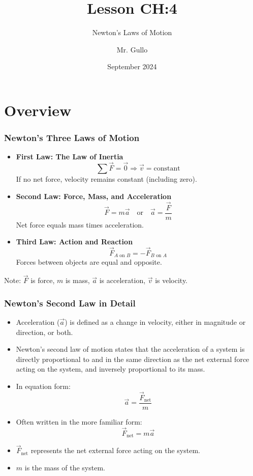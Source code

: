 \documentclass{beamer}
\title{Lesson CH:4}
\subtitle{Newton's Laws of Motion}
\author{Mr. Gullo}
\date{September 2024}
\begin{document}
\frame{\titlepage}

\section{Overview}

\begin{frame}
\frametitle{Newton's Three Laws of Motion}

\begin{itemize}
    \item \textbf{First Law: The Law of Inertia}
    \begin{equation*}
    \sum \vec{F} = \vec{0} \Rightarrow \vec{v} = \text{constant}
    \end{equation*}
    If no net force, velocity remains constant (including zero).

    \item \textbf{Second Law: Force, Mass, and Acceleration}
    \begin{equation*}
    \vec{F} = m\vec{a} \quad \text{or} \quad \vec{a} = \frac{\vec{F}}{m}
    \end{equation*}
    Net force equals mass times acceleration.

    \item \textbf{Third Law: Action and Reaction}
    \begin{equation*}
    \vec{F}_{A \text{ on } B} = -\vec{F}_{B \text{ on } A}
    \end{equation*}
    Forces between objects are equal and opposite.
\end{itemize}

\vspace{0.5cm}
\small{Note: $\vec{F}$ is force, $m$ is mass, $\vec{a}$ is acceleration, $\vec{v}$ is velocity.}
\end{frame}

\begin{frame}
\frametitle{Newton's Second Law in Detail}
\begin{itemize}
    \item Acceleration ($\vec{a}$) is defined as a change in velocity, either in magnitude or direction, or both.
    \item Newton's second law of motion states that the acceleration of a system is directly proportional to and in the same direction as the net external force acting on the system, and inversely proportional to its mass.
    \item In equation form:
    \[\vec{a}=\frac{\vec{F}_{\text{net}}}{m}\]
    \item Often written in the more familiar form:
    \[\vec{F}_{\text{net}}=m\vec{a}\]
    \item $\vec{F}_{\text{net}}$ represents the net external force acting on the system.
    \item $m$ is the mass of the system.
\end{itemize}
\end{frame}
\end{document}
